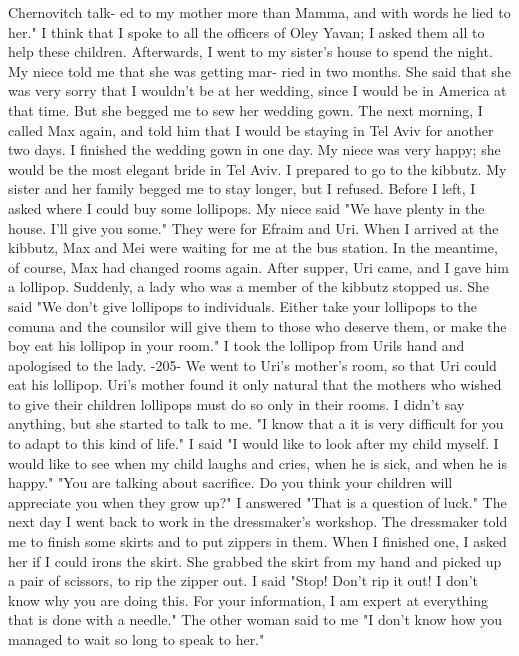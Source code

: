 Chernovitch talk-
ed to my mother more than Mamma, and with words he lied to her."
I think that I spoke to all the officers of Oley Yavan; I asked 
them all to help these children.
Afterwards, I went to my sister's 
house to spend the night.
My niece told me that she was getting mar-
ried in two months.
She said that she was very sorry that I wouldn't 
be at her wedding, since I would be in America at that time.
But she 
begged me to sew her wedding gown.
The next morning, I called Max again, and told him that I would 
be staying in Tel Aviv for another two days.
I finished the wedding 
gown in one day.
My niece was very happy; she would be the most elegant bride in Tel Aviv.
I prepared to go to the kibbutz.
My sister and her family 
begged me to stay longer, but I refused.
Before I left, I asked where 
I could buy some lollipops.
My niece said "We have plenty in the 
house.
I'll give you some."
They were for Efraim and Uri.
When I arrived at the kibbutz, Max and Mei were waiting for me at 
the bus station.
In the meantime, of course, Max had changed rooms again.
After supper, Uri came, and I gave him a lollipop.
Suddenly, 
a lady who was a member of the kibbutz stopped us.
She said "We don't 
give lollipops to individuals.
Either take your lollipops to the comuna and the counsilor will give them to those who deserve them, or 
make the boy eat his lollipop in your room."
I took the lollipop from Urils hand and apologised to the lady.
-205- 
We went to Uri's mother's room, so that Uri could eat his lollipop.
Uri's mother found it only natural that the mothers who wished to give 
their children lollipops must do so only in their rooms.
I didn't say 
anything, but she started to talk to me.
"I know that a it is very difficult for you to adapt to this kind 
of life."
I said "I would like to look after my child myself.
I would like 
to see when my child laughs and cries, when he is sick, and when he is 
happy."
"You are talking about sacrifice.
Do you think your children will 
appreciate you when they grow up?"
I answered "That is a question of luck."
The next day I went back to work in the dressmaker's workshop.
The dressmaker told me to finish some skirts and to put zippers in them.
When I finished one, I asked her if I could irons the skirt.
She grabbed the skirt from my hand and picked up a pair of scissors, to rip the 
zipper out.
I said "Stop!
Don't rip it out!
I don't know why you are doing 
this.
For your information, I am expert at everything that is done 
with a needle."
The other woman said to me "I don't know how you managed to wait so 
long to speak to her."
